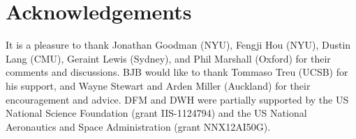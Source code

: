 \documentclass[12pt, preprint]{aastex}
\begin{document}


\section{Acknowledgements}
It is a pleasure to thank
  Jonathan Goodman (NYU),
  Fengji Hou (NYU),
  Dustin Lang (CMU),
  Geraint Lewis (Sydney), and
  Phil Marshall (Oxford)
for their comments and discussions.
BJB would like to thank Tommaso Treu (UCSB) for his support, and
Wayne Stewart and Arden Miller (Auckland) for their encouragement and advice.
DFM and DWH were partially supported by
   the US National Science Foundation (grant IIS-1124794) and
   the US National Aeronautics and Space Administration (grant NNX12AI50G).

\appendix
\end{document}
